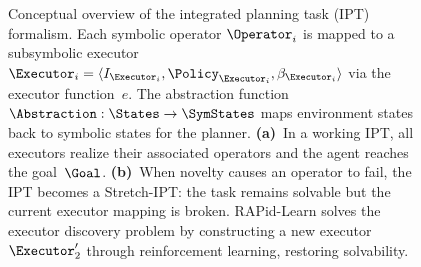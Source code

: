 \begin{figure}[t]
    \caption{Conceptual overview of the integrated planning task (IPT) formalism. Each symbolic operator $\Operator_i$ is mapped to a subsymbolic executor $\Executor_i = \langle I_{\Executor_i}, \Policy_{\Executor_i}, \beta_{\Executor_i} \rangle$ via the executor function~$e$. The abstraction function $\Abstraction : \States \rightarrow \SymStates$ maps environment states back to symbolic states for the planner. \textbf{(a)}~In a working IPT, all executors realize their associated operators and the agent reaches the goal~$\Goal$. \textbf{(b)}~When novelty causes an operator to fail, the IPT becomes a Stretch-IPT: the task remains solvable but the current executor mapping is broken. RAPid-Learn solves the executor discovery problem by constructing a new executor~$\Executor'_2$ through reinforcement learning, restoring solvability.}
    \label{fig:ipt_overview}
\end{figure}